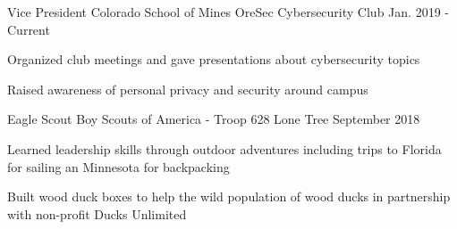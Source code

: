 \vspace{-2.0mm}

\begin{cventries}

  \cventry
    {Vice President} %
    {Colorado School of Mines OreSec Cybersecurity Club} %
    {} %
    {Jan. 2019 - Current} %
    {
      \begin{cvitems} %
        \item {Organized club meetings and gave presentations about
            cybersecurity topics}
        \item {Raised awareness of personal privacy and security around campus}
      \end{cvitems}
    }

  \cventry
    {Eagle Scout} %
    {Boy Scouts of America - Troop 628} %
    {Lone Tree} %
    {September 2018} %
    {
      \begin{cvitems} %
        \item {Learned leadership skills through outdoor adventures
            including trips to Florida for sailing an Minnesota for
            backpacking}
        \item {Built wood duck boxes to help the wild population of
            wood ducks in partnership with non-profit Ducks Unlimited}
      \end{cvitems}
    }

\end{cventries}
